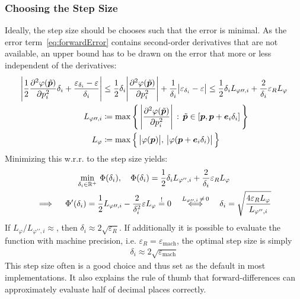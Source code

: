 			\subsubsection{Choosing the Step Size}
				Ideally, the step size should be chooses such that the error is minimal. As the error term~\eqref{eq:forwardError} contains second-order derivatives that are not available, an upper bound has to be drawn on the error that more or less independent of the derivatives:
				\begin{align*}
					\Bigg\lvert \frac{1}{2} \pdv[2]{\varphi(\tilde{\bm{p}})}{p_i} \delta_i + \frac{\varepsilon_{\delta_i} - \varepsilon}{\delta_i} \Bigg\rvert
						&\leq \frac{1}{2} \delta_i \Bigg\lvert \pdv[2]{\varphi(\tilde{\bm{p}})}{p_i} \Bigg\rvert + \frac{1}{\delta_i} \big\lvert \varepsilon_{\delta_i} - \varepsilon \big\rvert
						\leq \frac{1}{2} \delta_i L_{\varphi\prime\prime, i} + \frac{2}{\delta_i} \varepsilon_R L_\varphi \\
					L_{\varphi\prime\prime, i} &\coloneqq \max\Bigg\{\, \Bigg\lvert \pdv[2]{\varphi(\tilde{\bm{p}})}{p_i} \Bigg\rvert \,:\, \tilde{\bm{p}} \in [\bm{p}, \bm{p} + \bm{e}_i \delta_i] \,\Bigg\} \\
					L_\varphi &\coloneqq \max\Big\{\, \big\lvert \varphi(\bm{p}) \big\rvert,\, \big\lvert \varphi(\bm{p} + \bm{e}_i \delta_i) \big\rvert \,\Big\}
				\end{align*}
				Minimizing this w.r.r. to the step size yields:
				\begin{gather*}
					\min_{\delta_i \in \mathbb{R}^+} \, \Phi(\delta_i),\quad \Phi(\delta_i) = \frac{1}{2} \delta_i L_{\varphi'', i} + \frac{2}{\delta_i} \varepsilon_R L_\varphi \\
					\implies\quad \Phi'(\delta_i) = \frac{1}{2} L_{\varphi\prime\prime, i} - \frac{2}{\delta_i^2} \varepsilon L_\varphi \overset{!}{=} 0
					\quad\overset{L_{\varphi\prime\prime, i} \,\neq\, 0}{\iff}\quad \delta_i = \sqrt{\frac{4 \varepsilon_R L_\varphi}{L_{\varphi'', i}}}
				\end{gather*}
				If \( L_\varphi / L_{\varphi\prime\prime, i} \approx \), then \( \delta_i \approx 2 \sqrt{\varepsilon_R} \). If additionally it is possible to evaluate the function with machine precision, i.e. \( \varepsilon_R = \varepsilon_\mathrm{mach} \), the optimal step size is simply
				\begin{align*}
					\delta_i \approx 2 \sqrt{\varepsilon_\mathrm{mach}}
				\end{align*}
				This step size often is a good choice and thus set as the default in most implementations. It also explains the rule of thumb that forward-differences can approximately evaluate half of decimal places correctly.

